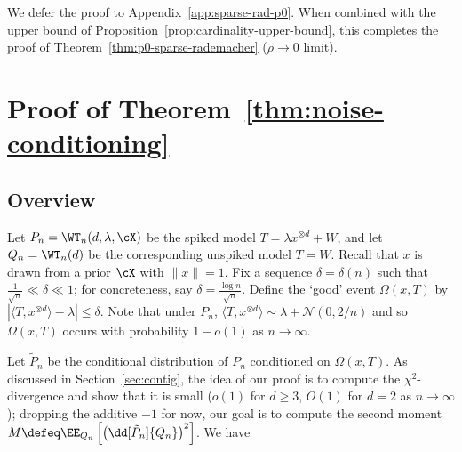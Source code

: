 \documentclass{article}
\begin{document}
\noindent We defer the proof to Appendix~\ref{app:sparse-rad-p0}. When combined with the upper bound of Proposition~\ref{prop:cardinality-upper-bound}, this completes the proof of Theorem~\ref{thm:p0-sparse-rademacher} ($\rho \to 0$ limit).









\section{Proof of Theorem~\ref{thm:noise-conditioning}}
\label{sec:noise-conditioning-proof}

\subsection{Overview}

Let $P_n = \WT_n(d,\lambda,\cX)$ be the spiked model $T = \lambda x^{\otimes d} + W$, and let $Q_n = \WT_n(d)$ be the corresponding unspiked model $T = W$. Recall that $x$ is drawn from a prior $\cX$ with $\|x\| = 1$. Fix a sequence $\delta = \delta(n)$ such that $\frac{1}{\sqrt n} \ll \delta \ll 1$; for concreteness, say $\delta = \frac{\log n}{\sqrt n}$. Define the `good' event $\Omega(x,T)$ by $|\langle T, x^{\otimes d} \rangle - \lambda| \le \delta$. Note that under $P_n$, $\langle T,x^{\otimes d} \rangle \sim \lambda + \mathcal{N}(0,2/n)$ and so $\Omega(x,T)$ occurs with probability $1-o(1)$ as $n \to \infty$.

Let $\tilde P_n$ be the conditional distribution of $P_n$ conditioned on $\Omega(x,T)$. As discussed in Section~\ref{sec:contig}, the idea of our proof is to compute the $\chi^2$-divergence and show that it is small ($o(1)$ for $d \ge 3$, $O(1)$ for $d = 2$ as $n \to \infty$); dropping the additive $-1$ for now, our goal is to compute the second moment $M \defeq \EE_{Q_n}\left[ \left(\dd[\tilde P_n]{Q_n}\right)^2 \right]$. We have
\end{document}
